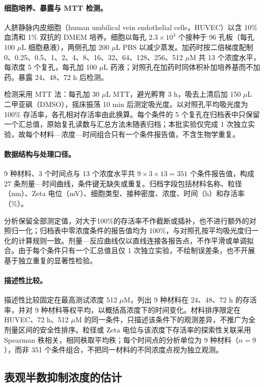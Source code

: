 \paragraph{细胞培养、暴露与 MTT 检测。}
人脐静脉内皮细胞（human umbilical vein endothelial cells，HUVEC）以含 10\% 血清和 1\% 双抗的 DMEM 培养。细胞以每孔 $2.3\times 10^{3}$ 个接种于 96 孔板（每孔 100 $\mu$L 细胞悬液），两侧孔加 200 $\mu$L PBS 以减少蒸发。加药时按二倍梯度配制 0、0.25、0.5、1、2、4、8、16、32、64、128、256、512 $\mu$M 共 13 个浓度水平，每浓度 5 个复孔，每孔加 100 $\mu$L 药液；对照孔在加药时同体积补加培养基而不加药。暴露 24、48、72 h 后检测。

检测采用 MTT 法：每孔加 30 $\mu$L MTT，避光孵育 3 h，吸去上清后加 150 $\mu$L 二甲亚砜（DMSO），摇床振荡 10 min 后测定吸光度。以对照孔平均吸光度为 100\% 存活率，各孔相对存活率由此换算。每个条件的 5 个复孔在归档表中只保留一个汇总值，原始复孔读数与汇总方法未随表归档；本批实验仅完成 1 次独立实验，故每个材料—浓度—时间组合只有一个条件报告值，不含生物学重复。

\paragraph{数据结构与处理口径。}
9 种材料、3 个时间点与 13 个浓度水平共 $9\ensuremath{\times} 3\ensuremath{\times} 13 = 351$ 个条件报告值，构成 27 条剂量—时间曲线，条件键无缺失或重复。归档字段包括材料名称、粒径（nm）、Zeta 电位（mV）、细胞类型、接种密度、浓度、时间（h）和存活率（\%）。

分析保留全部测定值，对大于\nobreakspace{}100\%的存活率不作截断或插补，也不进行额外的对照归一化；归档表中零浓度条件的报告值均为 100\%，与对照孔按平均吸光度归一化的计算规则一致。剂量—反应曲线仅以直线连接各报告点，不作平滑或单调拟合。由于每个条件只有一个汇总值且仅 1 次独立实验，不绘制误差条，也不开展基于独立重复的显著性检验。

\paragraph{描述性比较。}
描述性比较固定在最高测试浓度 512 $\mu$M，列出 9 种材料在 24、48、72 h 的存活率，并对 9 种材料等权平均，以概括高浓度下的时间变化。材料排序限定在 HUVEC、72 h、512 $\mu$M 的同一条件，只描述该条件下的观测差异，不推广为全剂量区间的安全性排序。粒径或 Zeta 电位与该浓度下存活率的探索性关联采用 Spearman 秩相关，相同秩取平均秩；每个时间点的分析单位为 9 种材料（$n = 9$），而非 351 个条件组合，不把同一材料的不同浓度点视为独立观测。

\subsection{表观半数抑制浓度的估计}

